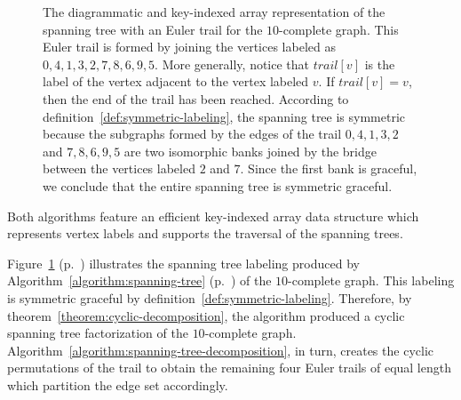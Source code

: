 \documentclass{article}
\begin{document}
\begin{figure}[b!]
\caption{The diagrammatic and key-indexed array representation of the spanning tree with an Euler trail for the $10$-complete graph. This Euler trail is formed by joining the vertices labeled as $0,4,1,3,2,7,8,6,9,5$. More generally, notice that $trail[v]$ is the label of the vertex adjacent to the vertex labeled $v$. If $trail[v] = v$, then the end of the trail has been reached. According to definition~\eqref{def:symmetric-labeling}, the spanning tree is symmetric because the subgraphs formed by the edges of the trail $0,4,1,3,2$ and $7,8,6,9,5$ are two isomorphic banks joined by the bridge between the vertices labeled $2$ and $7$. Since the first bank is graceful, we conclude that the entire spanning tree is symmetric graceful.}
\label{fig:spanning-tree}
\end{figure}

Both algorithms feature an efficient key-indexed array data structure which represents vertex labels and supports the traversal of the spanning trees.

\begin{example}
Figure~\ref{fig:spanning-tree} (p.~\pageref{fig:spanning-tree}) illustrates the spanning tree labeling produced by Algorithm~\ref{algorithm:spanning-tree} (p.~\pageref{algorithm:spanning-tree}) of the $10$-complete graph. This labeling is symmetric graceful by definition~\eqref{def:symmetric-labeling}. Therefore, by theorem~\eqref{theorem:cyclic-decomposition}, the algorithm produced a cyclic spanning tree factorization of the $10$-complete graph. Algorithm~\ref{algorithm:spanning-tree-decomposition}, in turn, creates the cyclic permutations of the trail to obtain the remaining four Euler trails of equal length which partition the edge set accordingly.
\end{example}
\end{document}
